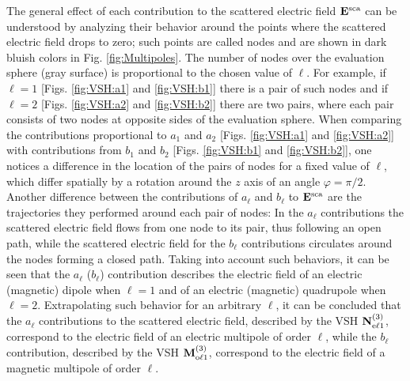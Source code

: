 The general effect of each contribution to the scattered electric field  $\vb{E}^\text{sca}$  can be understood by analyzing their behavior around the points where the scattered electric field drops to  zero; such points are called nodes and are shown in dark bluish colors in  Fig. \ref{fig:Multipoles}. The number of nodes over the evaluation sphere (gray surface) is proportional to the chosen value of $\ell$. For example, if $\ell = 1$ [Figs. \ref{fig:VSH:a1} and \ref{fig:VSH:b1}] there is a pair of such nodes and if $\ell = 2$ [Figs. \ref{fig:VSH:a2} and \ref{fig:VSH:b2}] there are two pairs, where each pair consists of two nodes at opposite sides of the evaluation sphere. When comparing the contributions proportional to $a_1$ and $a_2$ [Figs. \ref{fig:VSH:a1} and \ref{fig:VSH:a2}] with contributions from $b_1$ and $b_2$ [Figs. \ref{fig:VSH:b1} and \ref{fig:VSH:b2}], one notices a difference in the location of the pairs of nodes for a fixed value of $\ell$, which differ spatially by a rotation around the $z$ axis of an angle $\varphi = \pi/2$.  Another difference between the contributions of $a_\ell$ and  $b_\ell$ to  $\vb{E}^\text{sca}$ are the trajectories they performed around each pair of nodes: In the $a_\ell$ contributions the scattered electric field flows from one node to its pair, thus following an open path, while the scattered electric field for the $b_\ell$ contributions circulates around the nodes forming a closed path. Taking into account such behaviors, it can be seen that the $a_\ell$ ($b_\ell$) contribution describes the electric field of an electric (magnetic) dipole when $\ell = 1$ and of an electric (magnetic) quadrupole when $\ell = 2$. Extrapolating such behavior for an arbitrary $\ell$,  it can be concluded that the $a_\ell$ contributions to the scattered electric field, described by the VSH $\vb{N}^{(3)}_{\text{e}\ell 1}$, correspond to the electric field of an electric multipole of order $\ell$, while the $b_\ell$ contribution, described by the VSH $\vb{M}^{(3)}_{\text{o}\ell 1}$, correspond to the electric field of a magnetic multipole of order $\ell$.

